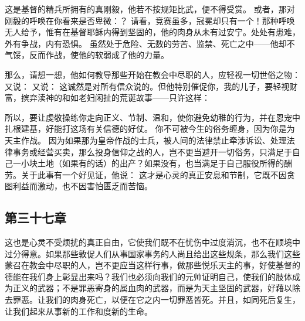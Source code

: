 这是基督的精兵所拥有的真刚毅，他若不按规矩比武，便不得受赏。 或者，那对刚毅的呼唤在你看来是否卑微：？ 请看，竞赛虽多，冠冕却只有一个！那种呼唤无人给予，惟有在基督耶稣内得到坚固的，他的肉身从未有过安宁。处处有患难，外有争战，内有恐惧。 虽然处于危险、无数的劳苦、监禁、死亡之中——他却不气馁，反而作战，使他的软弱成了他的力量。\par

那么，请想一想，他如何教导那些开始在教会中尽职的人，应轻视一切世俗之物： 又说： 又说： 这诚然是对所有信众说的。但他特别催促你，我的儿子，要轻视财富，摈弃渎神的和如老妇闲扯的荒诞故事——只许这样：\par

所以，要让虔敬操练你走向正义、节制、温和，使你避免幼稚的行为，并在恩宠中扎根建基，好能打这场有关信德的好仗。 你不可被今生的俗务缠身，因为你是为天主作战。 因为如果那为皇帝作战的士兵，被人间的法律禁止牵涉诉讼、处理法律事务或经营买卖，那么投身信仰之战的人，岂不更当避开一切俗务，只满足于自己一小块土地（如果有的话）的出产？如果没有，也当满足于自己服役所得的酬劳。关于此事有一个好见证，他说： 这才是心灵的真正安息和节制，它既不因贪图利益而激动，也不因害怕匮乏而苦恼。\par


\subsection{第三十七章}

\par

这也是心灵不受烦扰的真正自由，它使我们既不在忧伤中过度消沉，也不在顺境中过分得意。如果那些敦促人们从事国家事务的人尚且给出这些规条，那么我们这些蒙召在教会中尽职的人，岂不更应当这样行事，做那些悦乐天主的事，好使基督的德能在我们身上彰显出来吗？我们也必须向我们的元帅证明自己，使我们的肢体成为正义的武器；不是罪恶寄身的属血肉的武器，而是为天主坚固的武器，好藉以除去罪恶。让我们的肉身死亡，以便在它之内一切罪恶皆死。并且，如同死后复生，让我们起来从事新的工作和度新的生命。\par

